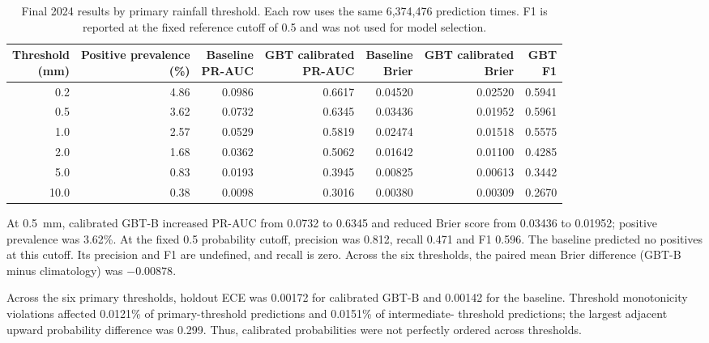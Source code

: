 \documentclass[11pt,a4paper]{article}
\begin{document}
\begin{table}[htbp]
\centering\scriptsize
\caption{Final 2024 results by primary rainfall threshold. Each row uses the
same 6,374,476 prediction times. F1 is reported at the fixed reference cutoff
of 0.5 and was not used for model selection.}
\label{tab:test}
\begin{tabular}{r r r r r r r}
\toprule
\shortstack{Threshold\\(mm)} & \shortstack{Positive prevalence\\(\%)} & \shortstack{Baseline\\PR-AUC} & \shortstack{GBT calibrated\\PR-AUC} & \shortstack{Baseline\\Brier} & \shortstack{GBT calibrated\\Brier} & \shortstack{GBT\\F1} \\
\midrule
0.2 & 4.86 & 0.0986 & 0.6617 & 0.04520 & 0.02520 & 0.5941 \\
0.5 & 3.62 & 0.0732 & 0.6345 & 0.03436 & 0.01952 & 0.5961 \\
1.0 & 2.57 & 0.0529 & 0.5819 & 0.02474 & 0.01518 & 0.5575 \\
2.0 & 1.68 & 0.0362 & 0.5062 & 0.01642 & 0.01100 & 0.4285 \\
5.0 & 0.83 & 0.0193 & 0.3945 & 0.00825 & 0.00613 & 0.3442 \\
10.0 & 0.38 & 0.0098 & 0.3016 & 0.00380 & 0.00309 & 0.2670 \\
\bottomrule
\end{tabular}
\end{table}

At 0.5~mm, calibrated GBT-B increased PR-AUC from 0.0732 to 0.6345 and reduced
Brier score from 0.03436 to 0.01952; positive prevalence was 3.62\%. At the
fixed 0.5 probability cutoff, precision was 0.812, recall 0.471 and F1 0.596.
The baseline predicted no positives at this cutoff. Its precision and F1 are
undefined, and recall is zero. Across the six thresholds, the paired mean
Brier difference (GBT-B minus climatology) was $-0.00878$.

Across the six primary thresholds, holdout ECE was 0.00172 for calibrated
GBT-B and 0.00142 for the baseline. Threshold monotonicity violations affected
0.0121\% of primary-threshold predictions and 0.0151\% of intermediate-
threshold predictions; the largest adjacent upward probability difference
was 0.299. Thus, calibrated probabilities were not perfectly ordered across
thresholds.
\end{document}
